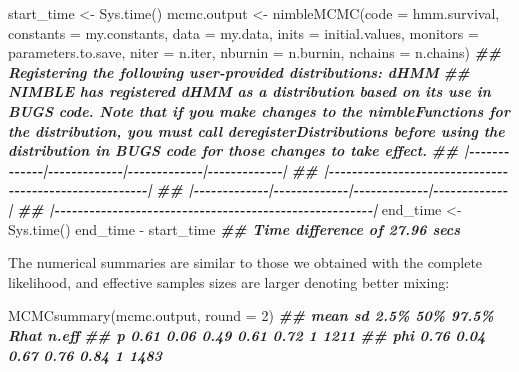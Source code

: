 \documentclass[
  12pt,
]{krantz}
\newenvironment{Shaded}{\begin{snugshade}}{\end{snugshade}}
\newcommand{\AttributeTok}[1]{\textcolor[rgb]{0.77,0.63,0.00}{#1}}
\newcommand{\DecValTok}[1]{\textcolor[rgb]{0.00,0.00,0.81}{#1}}
\newcommand{\DocumentationTok}[1]{\textcolor[rgb]{0.56,0.35,0.01}{\textbf{\textit{#1}}}}
\newcommand{\FunctionTok}[1]{\textcolor[rgb]{0.00,0.00,0.00}{#1}}
\newcommand{\NormalTok}[1]{#1}
\newcommand{\OtherTok}[1]{\textcolor[rgb]{0.56,0.35,0.01}{#1}}
\newcommand{\SpecialCharTok}[1]{\textcolor[rgb]{0.00,0.00,0.00}{#1}}
\begin{document}
\begin{Shaded}
\begin{Highlighting}[]
\NormalTok{start\_time }\OtherTok{\textless{}{-}} \FunctionTok{Sys.time}\NormalTok{()}
\NormalTok{mcmc.output }\OtherTok{\textless{}{-}} \FunctionTok{nimbleMCMC}\NormalTok{(}\AttributeTok{code =}\NormalTok{ hmm.survival,}
                          \AttributeTok{constants =}\NormalTok{ my.constants,}
                          \AttributeTok{data =}\NormalTok{ my.data,}
                          \AttributeTok{inits =}\NormalTok{ initial.values,}
                          \AttributeTok{monitors =}\NormalTok{ parameters.to.save,}
                          \AttributeTok{niter =}\NormalTok{ n.iter,}
                          \AttributeTok{nburnin =}\NormalTok{ n.burnin,}
                          \AttributeTok{nchains =}\NormalTok{ n.chains)}
\DocumentationTok{\#\# Registering the following user{-}provided distributions: dHMM}
\DocumentationTok{\#\# NIMBLE has registered dHMM as a distribution based on its use in BUGS code. Note that if you make changes to the nimbleFunctions for the distribution, you must call \textquotesingle{}deregisterDistributions\textquotesingle{} before using the distribution in BUGS code for those changes to take effect.}
\DocumentationTok{\#\# |{-}{-}{-}{-}{-}{-}{-}{-}{-}{-}{-}{-}{-}|{-}{-}{-}{-}{-}{-}{-}{-}{-}{-}{-}{-}{-}|{-}{-}{-}{-}{-}{-}{-}{-}{-}{-}{-}{-}{-}|{-}{-}{-}{-}{-}{-}{-}{-}{-}{-}{-}{-}{-}|}
\DocumentationTok{\#\# |{-}{-}{-}{-}{-}{-}{-}{-}{-}{-}{-}{-}{-}{-}{-}{-}{-}{-}{-}{-}{-}{-}{-}{-}{-}{-}{-}{-}{-}{-}{-}{-}{-}{-}{-}{-}{-}{-}{-}{-}{-}{-}{-}{-}{-}{-}{-}{-}{-}{-}{-}{-}{-}{-}{-}|}
\DocumentationTok{\#\# |{-}{-}{-}{-}{-}{-}{-}{-}{-}{-}{-}{-}{-}|{-}{-}{-}{-}{-}{-}{-}{-}{-}{-}{-}{-}{-}|{-}{-}{-}{-}{-}{-}{-}{-}{-}{-}{-}{-}{-}|{-}{-}{-}{-}{-}{-}{-}{-}{-}{-}{-}{-}{-}|}
\DocumentationTok{\#\# |{-}{-}{-}{-}{-}{-}{-}{-}{-}{-}{-}{-}{-}{-}{-}{-}{-}{-}{-}{-}{-}{-}{-}{-}{-}{-}{-}{-}{-}{-}{-}{-}{-}{-}{-}{-}{-}{-}{-}{-}{-}{-}{-}{-}{-}{-}{-}{-}{-}{-}{-}{-}{-}{-}{-}|}
\NormalTok{end\_time }\OtherTok{\textless{}{-}} \FunctionTok{Sys.time}\NormalTok{()}
\NormalTok{end\_time }\SpecialCharTok{{-}}\NormalTok{ start\_time}
\DocumentationTok{\#\# Time difference of 27.96 secs}
\end{Highlighting}
\end{Shaded}

The numerical summaries are similar to those we obtained with the complete likelihood, and effective samples sizes are larger denoting better mixing:

\begin{Shaded}
\begin{Highlighting}[]
\FunctionTok{MCMCsummary}\NormalTok{(mcmc.output, }\AttributeTok{round =} \DecValTok{2}\NormalTok{)}
\DocumentationTok{\#\#     mean   sd 2.5\%  50\% 97.5\% Rhat n.eff}
\DocumentationTok{\#\# p   0.61 0.06 0.49 0.61  0.72    1  1211}
\DocumentationTok{\#\# phi 0.76 0.04 0.67 0.76  0.84    1  1483}
\end{Highlighting}
\end{Shaded}
\end{document}
